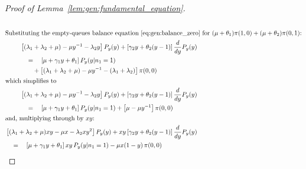 \begin{proof}[Proof of Lemma~\ref{lem:gen:fundamental_equation}]
\begin{align}
\begin{split}
        \end{split} \nonumber \\
        \intertext{Substituting the empty-queues balance equation~\eqref{eq:gen:balance_zero} for $(\mu+\theta_1)\pi(1,0)+(\mu+\theta_2)\pi(0,1)$:}
        \begin{split}
            & \left[ (\lambda_1 + \lambda_2 + \mu) - \mu y^{-1} - \lambda_2 y \right] P_y(y)
            + \left[ \gamma_2 y + \theta_2(y-1) \right] \frac{d}{dy} P_y(y) \\
            & \quad = \quad \left[ \mu + \gamma_1 y + \theta_1 \right] P_y(y | n_1=1) \\
            & \quad \quad + \left[ (\lambda_1 + \lambda_2 + \mu) - \mu y^{-1} - (\lambda_1 + \lambda_2) \right] \pi(0, 0)
        \end{split} \nonumber \\
        \intertext{which simplifies to}
        \begin{split}
            & \left[ (\lambda_1 + \lambda_2 + \mu) - \mu y^{-1} - \lambda_2 y \right] P_y(y)
            + \left[ \gamma_2 y + \theta_2(y-1) \right] \frac{d}{dy} P_y(y) \\
            & \quad = \quad \left[ \mu + \gamma_1 y + \theta_1 \right] P_y(y | n_1=1)
            + \left[ \mu - \mu y^{-1} \right] \pi(0, 0)
        \end{split} \nonumber \\
        \intertext{and, multiplying through by $xy$:}
        \begin{split}
            & \left[ (\lambda_1 + \lambda_2 + \mu)xy - \mu x - \lambda_2 x y^2 \right] P_y(y)
            + xy \left[ \gamma_2 y + \theta_2(y-1) \right] \frac{d}{dy} P_y(y) \\
            & \quad = \quad \left[ \mu + \gamma_1 y + \theta_1 \right] xy \, P_y(y | n_1=1)
            - \mu x(1-y) \, \pi(0,0)
        \end{split} \label{eq:gen:transform_y_boundary}
    \end{align}
    

\end{proof}
